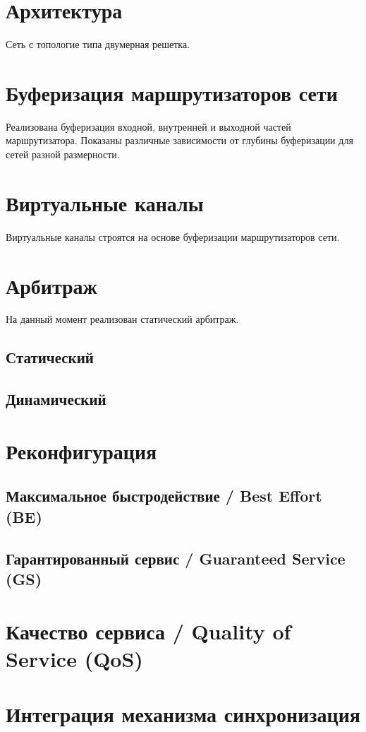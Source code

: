 \section{Архитектура}

Сеть с топологие типа двумерная решетка.

\section{Буферизация маршрутизаторов сети}

Реализована буферизация входной, внутренней и выходной частей маршрутизатора. Показаны различные зависимости от глубины буферизации для сетей разной размерности.

\section{Виртуальные каналы}

Виртуальные каналы строятся на основе буферизации маршрутизаторов сети.

\section{Арбитраж}

На данный момент реализован статический арбитраж.

\subsection{Статический}

\subsection{Динамический}

\section{Реконфигурация}

\subsection{Максимальное быстродействие / Best Effort (BE)}

\subsection{Гарантированный сервис / Guaranteed Service (GS)}

\section{Качество сервиса / Quality of Service (QoS)}

\section{Интеграция механизма синхронизация}

\clearpage

